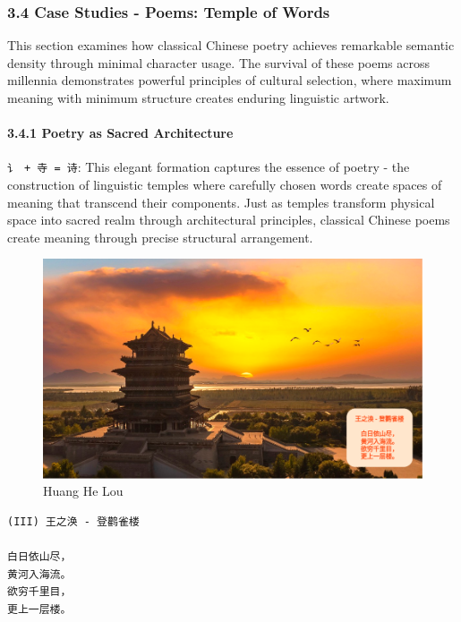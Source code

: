 \hypertarget{case-studies---poems-temple-of-words}{%
\subsubsection{3.4 Case Studies - Poems: Temple of
Words}\label{case-studies---poems-temple-of-words}}

This section examines how classical Chinese poetry achieves remarkable
semantic density through minimal character usage. The survival of these
poems across millennia demonstrates powerful principles of cultural
selection, where maximum meaning with minimum structure creates enduring
linguistic artwork.

\hypertarget{poetry-as-sacred-architecture}{%
\paragraph{3.4.1 Poetry as Sacred
Architecture}\label{poetry-as-sacred-architecture}}

\texttt{讠\ +\ 寺\ =\ 诗}: This elegant formation captures the essence
of poetry - the construction of linguistic temples where carefully
chosen words create spaces of meaning that transcend their components.
Just as temples transform physical space into sacred realm through
architectural principles, classical Chinese poems create meaning through
precise structural arrangement.

\begin{figure}
\centering
\includegraphics{./images/poem_huang-he-lou.png}
\caption{Huang He Lou}
\end{figure}

\begin{verbatim}
(III) 王之涣 - 登鹳雀楼

白日依山尽，
黄河入海流。
欲穷千里目，
更上一层楼。
\end{verbatim}

